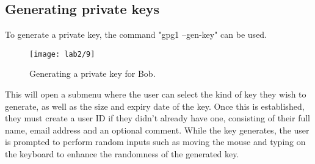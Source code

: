 \subsection{Generating private keys}

To generate a private key, the command "gpg1 --gen-key" can be used.

\begin{figure}[H]
    \centering
    \texttt{[image: lab2/9]}
    \caption{Generating a private key for Bob.}
    \label{fig:GPGgen}
\end{figure}

This will open a submenu where the user can select the kind of key they wish to generate,
as well as the size and expiry date of the key.
Once this is established, they must create a user ID if they didn't already have one,
consisting of their full name, email address and an optional comment.
While the key generates, the user is prompted to perform random inputs such as moving the mouse
and typing on the keyboard to enhance the randomness of the generated key.







